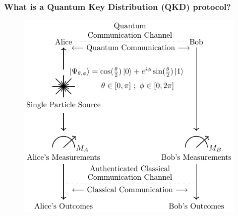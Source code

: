 \documentclass{beamer}
\begin{document}
		\begin{frame}
			\frametitle{\large What is a Quantum Key Distribution (QKD) protocol?}

            \vspace{4ex}
            \begin{figure}
                \centering
                \begin{minipage}{0.5\textwidth}
                    \centering
                    \includegraphics[width=0.95\linewidth, height=0.5\textheight]{figures/presentation/pdf/prepare-and-measure-qkd-protocol.pdf}
                    \vspace{-1.5ex}
                    \caption{\color{blue}{Figure 1a: }}
                    \label{fig:prepare-measure-qkd-protocol}
                \end{minipage}%
                \begin{minipage}{0.5\textwidth}
                    \centering

\end{minipage}
\end{figure}
\end{frame}
\end{document}
